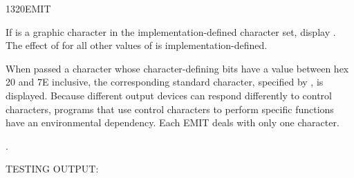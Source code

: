 \begin{worddef}{1320}{EMIT}
\item {}

	If  is a graphic character in the implementation-defined
	character set, display . The effect of  for all
	other values of  is implementation-defined.

	When passed a character whose character-defining bits have a
	value between hex 20 and 7E inclusive, the corresponding
	standard character, specified by , is displayed. Because different output
	devices can respond differently to control characters, programs
	that use control characters to perform specific functions have
	an environmental dependency. Each EMIT deals with only one
	character.

\see {}.

	\begin{defer}
	\testing
		TESTING OUTPUT:        


\end{defer}
\end{worddef}
